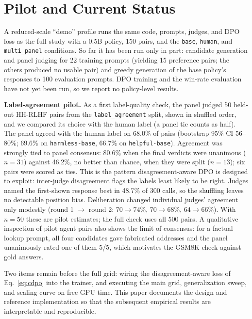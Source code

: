 \documentclass[conference]{IEEEtran}
\begin{document}
\section{Pilot and Current Status}
\label{sec:status}
A reduced-scale ``demo'' profile runs the same code, prompts, judges, and DPO loss
as the full study with a 0.5B policy, 150 pairs, and the \texttt{base},
\texttt{human}, and \texttt{multi\_panel} conditions. So far it has been run
only in part: candidate generation and panel judging for 22 training prompts
(yielding 15 preference pairs; the others produced no usable pair) and greedy
generation of the base policy's responses to 100 evaluation prompts. DPO training
and the win-rate evaluation have not yet been run, so we report no policy-level
results.

\textbf{Label-agreement pilot.} As a first label-quality check, the panel judged
50 held-out HH-RLHF pairs from the \texttt{label\_agreement} split, shown in
shuffled order, and we compared its choice with the human label (a panel tie
counts as half). The panel agreed with the human label on 68.0\% of pairs
(bootstrap 95\% CI 56--80\%; 69.6\% on \texttt{harmless-base}, 66.7\% on
\texttt{helpful-base}). Agreement was strongly tied to panel consensus:
80.6\% when the final verdicts were unanimous ($n{=}31$) against 46.2\%, no
better than chance, when they were split ($n{=}13$); six pairs were scored as
ties. This is the pattern disagreement-aware DPO is designed to exploit:
inter-judge disagreement flags the labels least likely to be right. Judges named
the first-shown response best in 48.7\% of 300 calls, so the shuffling leaves no
detectable position bias. Deliberation changed individual judges' agreement
only modestly (round 1 $\rightarrow$ round 2: $70\rightarrow74\%$,
$70\rightarrow68\%$, $64\rightarrow66\%$). With $n{=}50$ these are pilot
estimates; the full check uses all 500 pairs. A qualitative inspection of pilot
agent pairs also shows the limit of consensus: for a factual lookup prompt, all
four candidates gave fabricated addresses and the panel unanimously rated one
of them 5/5, which motivates the GSM8K check against gold answers.

Two items remain before the full grid: wiring the disagreement-aware
loss of Eq.~\eqref{eq:cdpo} into the trainer, and executing the main grid,
generalization sweep, and scaling curve on free GPU time. This paper documents the
design and reference implementation so that the subsequent empirical results are
interpretable and reproducible.
\end{document}

